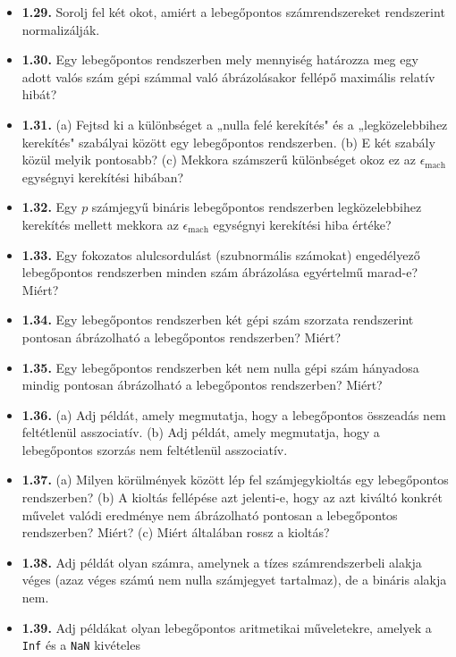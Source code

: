 \documentclass[
  magyar,
  11pt]{article}
\begin{document}
\begin{itemize}
  két pozitív lebegőpontos operandusra, melyek okozhatnak
  alulcsordulást? (a) összeadás; (b) kivonás; (c) szorzás; (d) osztás.
\item
  \textbf{1.29.} Sorolj fel két okot, amiért a lebegőpontos
  számrendszereket rendszerint normalizálják.
\item
  \textbf{1.30.} Egy lebegőpontos rendszerben mely mennyiség határozza
  meg egy adott valós szám gépi számmal való ábrázolásakor fellépő
  maximális relatív hibát?
\item
  \textbf{1.31.} (a) Fejtsd ki a különbséget a „nulla felé kerekítés" és
  a „legközelebbihez kerekítés" szabályai között egy lebegőpontos
  rendszerben. (b) E két szabály közül melyik pontosabb? (c) Mekkora
  számszerű különbséget okoz ez az \(\epsilon_{\text{mach}}\) egységnyi
  kerekítési hibában?
\item
  \textbf{1.32.} Egy \(p\) számjegyű bináris lebegőpontos rendszerben
  legközelebbihez kerekítés mellett mekkora az
  \(\epsilon_{\text{mach}}\) egységnyi kerekítési hiba értéke?
\item
  \textbf{1.33.} Egy fokozatos alulcsordulást (szubnormális számokat)
  engedélyező lebegőpontos rendszerben minden szám ábrázolása egyértelmű
  marad-e? Miért?
\item
  \textbf{1.34.} Egy lebegőpontos rendszerben két gépi szám szorzata
  rendszerint pontosan ábrázolható a lebegőpontos rendszerben? Miért?
\item
  \textbf{1.35.} Egy lebegőpontos rendszerben két nem nulla gépi szám
  hányadosa mindig pontosan ábrázolható a lebegőpontos rendszerben?
  Miért?
\item
  \textbf{1.36.} (a) Adj példát, amely megmutatja, hogy a lebegőpontos
  összeadás nem feltétlenül asszociatív. (b) Adj példát, amely
  megmutatja, hogy a lebegőpontos szorzás nem feltétlenül asszociatív.
\item
  \textbf{1.37.} (a) Milyen körülmények között lép fel számjegykioltás
  egy lebegőpontos rendszerben? (b) A kioltás fellépése azt jelenti-e,
  hogy az azt kiváltó konkrét művelet valódi eredménye nem ábrázolható
  pontosan a lebegőpontos rendszerben? Miért? (c) Miért általában rossz
  a kioltás?
\item
  \textbf{1.38.} Adj példát olyan számra, amelynek a tízes
  számrendszerbeli alakja véges (azaz véges számú nem nulla számjegyet
  tartalmaz), de a bináris alakja nem.
\item
  \textbf{1.39.} Adj példákat olyan lebegőpontos aritmetikai
  műveletekre, amelyek a \texttt{Inf} és a \texttt{NaN} kivételes

\end{itemize}
\end{document}
